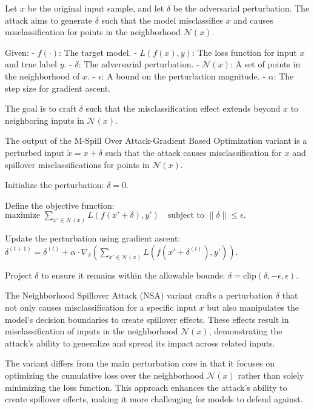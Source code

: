 Let $x$ be the original input sample, and let $\delta$ be the adversarial perturbation. The attack aims to generate $\delta$ such that the model misclassifies $x$ and causes misclassification for points in the neighborhood $\mathcal{N}(x)$.

Given:
- $f(\cdot)$: The target model.
- $L(f(x), y)$: The loss function for input $x$ and true label $y$.
- $\delta$: The adversarial perturbation.
- $\mathcal{N}(x)$: A set of points in the neighborhood of $x$.
- $\epsilon$: A bound on the perturbation magnitude.
- $\alpha$: The step size for gradient ascent.

The goal is to craft $\delta$ such that the misclassification effect extends beyond $x$ to neighboring inputs in $\mathcal{N}(x)$.

The output of the M-Spill Over Attack-Gradient Based Optimization variant is a perturbed input $\tilde{x} = x + \delta$ such that the attack causes misclassification for $x$ and spillover misclassifications for points in $\mathcal{N}(x)$.

Initialize the perturbation:
   $\delta = 0.$

Define the objective function:
   $\text{maximize } \sum_{x' \in \mathcal{N}(x)} L(f(x' + \delta), y') \quad \text{subject to } \|\delta\| \leq \epsilon.$

Update the perturbation using gradient ascent:
   $\delta^{(t+1)} = \delta^{(t)} + \alpha \cdot \nabla_{\delta} \left( \sum_{x' \in \mathcal{N}(x)} L(f(x' + \delta^{(t)}), y') \right).$

Project $\delta$ to ensure it remains within the allowable bounds:
   $\delta = \text{clip}(\delta, -\epsilon, \epsilon).$

The Neighborhood Spillover Attack (NSA) variant crafts a perturbation $\delta$ that not only causes misclassification for a specific input $x$ but also manipulates the model's decision boundaries to create spillover effects. These effects result in misclassification of inputs in the neighborhood $\mathcal{N}(x)$, demonstrating the attack's ability to generalize and spread its impact across related inputs.

The variant differs from the main perturbation core in that it focuses on optimizing the cumulative loss over the neighborhood $\mathcal{N}(x)$ rather than solely minimizing the loss function. This approach enhances the attack's ability to create spillover effects, making it more challenging for models to defend against.